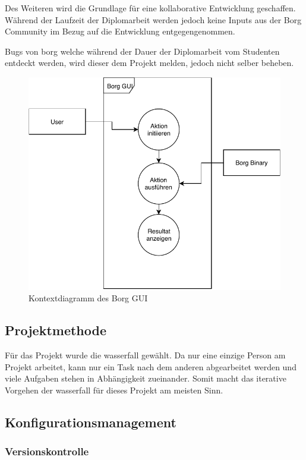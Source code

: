 Des Weiteren wird die Grundlage für eine kollaborative Entwicklung geschaffen.
Während der Laufzeit der Diplomarbeit werden jedoch keine Inputs aus der Borg
Community im Bezug auf die Entwicklung entgegengenommen.

Bugs von \gls{borg} welche während der Dauer der Diplomarbeit vom Studenten
entdeckt werden, wird dieser dem Projekt melden, jedoch nicht selber beheben.

\begin{figure}[htbp]
\centering
\includegraphics[width=.9\linewidth]{pictures/kontextdiagramm.pdf}
\caption{\label{fig:org5ba804d}
Kontextdiagramm des Borg GUI}
\end{figure}

\subsection{Projektmethode}
\label{sec:org7ae08c5}

Für das Projekt wurde die \gls{wasserfall} gewählt. Da nur eine
einzige Person am Projekt arbeitet, kann nur ein Task nach dem anderen
abgearbeitet werden und viele Aufgaben stehen in Abhängigkeit zueinander.
Somit macht das iterative Vorgehen der \gls{wasserfall} für dieses Projekt am
meisten Sinn.

\subsection{Konfigurationsmanagement}
\label{sec:org54092b2}

\subsubsection{Versionskontrolle}
\label{sec:org7cdfd56}

